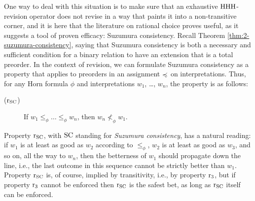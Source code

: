 

One way to deal with this situation is to make sure that 
an exhaustive ${\mathrm{HHH}}$-revision operator does not 
revise in a way that paints it into a non-transitive corner,
and it is here that the literature on rational choice proves useful,
as it suggests a tool of proven efficacy: Suzumura consistency.
Recall Theorem \ref{thm:2-suzumura-consistency},
saying that Suzumura consistency 
is both a necessary and sufficient condition for a binary relation to
have an extension that is a total preorder.
In the context of revision, we can formulate Suzumura consistency
as a property that applies to preorders in an assignment $\preccurlyeq$ on interpretations.
Thus, for any 
Horn formula $\phi$
and interpretations $w_1$, \dots, $w_n$, 
the property is as follows:

\begin{description}
	\item[($\mathrm{r}_{{\mathrm{SC}}}$)] If $w_1 \le_{\phi}\dots \le_{\phi}w_n$,
		then $w_{n}\not<_{\phi} w_{1}$.
\end{description}

Property $\mathrm{r}_{{\mathrm{SC}}}$, 
with ${\mathrm{SC}}$ standing for \emph{Suzumura consistency},
has a natural reading: 
if $w_1$ is at least as good as $w_2$ according to $\le_\phi$,
$w_2$ is at least as good as $w_3$,
and so on, all the way to $w_n$, then
the betterness of $w_1$ should propagate down the line,
i.e., the last outcome in this sequence cannot 
be strictly better than $w_1$.
Property $\mathrm{r}_{{\mathrm{SC}}}$ is, of course, implied by transitivity,
i.e., by property $\mathrm{r}_{3}$,
but if property $\mathrm{r}_{3}$ cannot be enforced then $\mathrm{r}_{{\mathrm{SC}}}$
is the safest bet, as long as $\mathrm{r}_{{\mathrm{SC}}}$ itself can be enforced.

